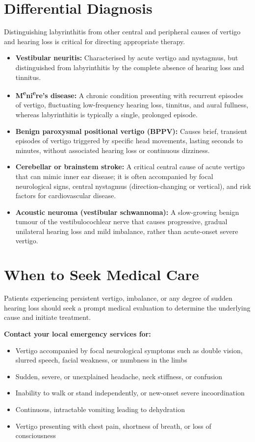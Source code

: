 \section*{Differential Diagnosis}
Distinguishing labyrinthitis from other central and peripheral causes of vertigo and hearing loss is critical for directing appropriate therapy.
\begin{itemize}
    \item \textbf{Vestibular neuritis:} Characterised by acute vertigo and nystagmus, but distinguished from labyrinthitis by the complete absence of hearing loss and tinnitus.
    \item \textbf{M\textsuperscript{e}ni\textsuperscript{e}re's disease:} A chronic condition presenting with recurrent episodes of vertigo, fluctuating low-frequency hearing loss, tinnitus, and aural fullness, whereas labyrinthitis is typically a single, prolonged episode.
    \item \textbf{Benign paroxysmal positional vertigo (BPPV):} Causes brief, transient episodes of vertigo triggered by specific head movements, lasting seconds to minutes, without associated hearing loss or continuous dizziness.
    \item \textbf{Cerebellar or brainstem stroke:} A critical central cause of acute vertigo that can mimic inner ear disease; it is often accompanied by focal neurological signs, central nystagmus (direction-changing or vertical), and risk factors for cardiovascular disease.
    \item \textbf{Acoustic neuroma (vestibular schwannoma):} A slow-growing benign tumour of the vestibulocochlear nerve that causes progressive, gradual unilateral hearing loss and mild imbalance, rather than acute-onset severe vertigo.
\end{itemize}

\section*{When to Seek Medical Care}
Patients experiencing persistent vertigo, imbalance, or any degree of sudden hearing loss should seek a prompt medical evaluation to determine the underlying cause and initiate treatment.

\textbf{Contact your local emergency services for:}
\begin{itemize}
    \item Vertigo accompanied by focal neurological symptoms such as double vision, slurred speech, facial weakness, or numbness in the limbs
    \item Sudden, severe, or unexplained headache, neck stiffness, or confusion
    \item Inability to walk or stand independently, or new-onset severe incoordination
    \item Continuous, intractable vomiting leading to dehydration
    \item Vertigo presenting with chest pain, shortness of breath, or loss of consciousness
\end{itemize}

